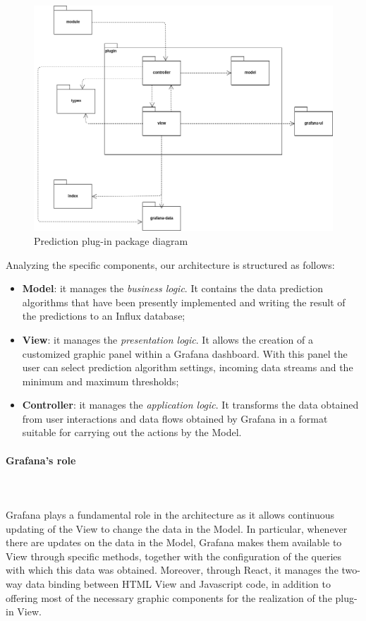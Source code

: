\begin{figure}[H]
\centering
\includegraphics[scale=0.45]{../../../Diagrams/Package_diagrams/plugin_design_pattern.png}
\caption{Prediction plug-in package diagram}
\end{figure}

Analyzing the specific components, our architecture is structured as follows:
\begin{itemize}
\item \textbf{Model}: it manages the \textit{business logic}. It contains
the data prediction algorithms that have been presently implemented and writing the result of the predictions to an Influx database;
\item \textbf{View}: it manages the \textit{presentation logic}. It allows the creation of a customized graphic panel within a Grafana dashboard. With this panel the user can select prediction algorithm settings, incoming data streams and the minimum and maximum thresholds;
\item \textbf{Controller}: it manages the \textit{application logic}. It transforms the data obtained from user interactions and data flows obtained by Grafana in a format suitable for carrying out the actions by the Model.
\end{itemize}


\paragraph{Grafana's role}\mbox{} \\ \mbox{} \\
Grafana plays a fundamental role in the architecture as it allows continuous updating of the View to change the data in the Model. In particular, whenever there are updates on the data in the Model, Grafana makes them available to View through specific methods, together with the configuration of the queries with which this data was obtained. Moreover, through React, it manages the two-way data binding between HTML View and Javascript code, in addition to offering most of the necessary graphic components for the realization of the plug-in View.

